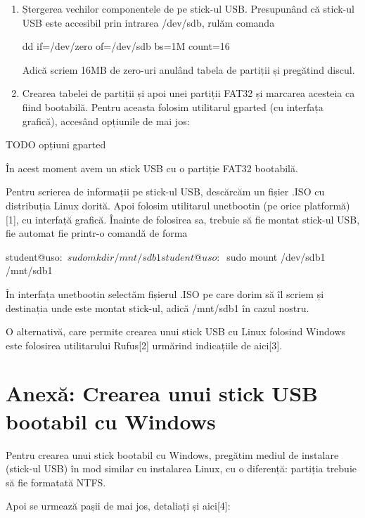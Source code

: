 \begin{enumerate}
	\item Ștergerea vechilor componentele de pe stick-ul USB. Presupunând că
		stick-ul USB este accesibil prin intrarea /dev/sdb, rulăm
		comanda

\begin{screen}
dd if=/dev/zero of=/dev/sdb bs=1M count=16
\end{screen}

Adică scriem 16MB de zero-uri anulând tabela de partiții și pregătind discul.

	\item Crearea tabelei de partiții și apoi unei partiții FAT32 și
		marcarea acesteia ca fiind bootabilă. Pentru aceasta folosim
		utilitarul gparted (cu interfața grafică), accesând opțiunile de
		mai jos:

\end{enumerate}

TODO opțiuni gparted

În acest moment avem un stick USB cu o partiție FAT32 bootabilă.

Pentru scrierea de informații pe stick-ul USB, descărcăm un fișier .ISO cu
distribuția Linux dorită. Apoi folosim utilitarul unetbootin (pe orice
platformă)[1], cu interfață grafică. Înainte de folosirea sa, trebuie să fie
montat stick-ul USB, fie automat fie printr-o comandă de forma

\begin{screen}
student@uso:~$ sudo mkdir /mnt/sdb1
student@uso:~$ sudo mount /dev/sdb1 /mnt/sdb1
\end{screen}

În interfața unetbootin selectăm fișierul .ISO pe care dorim să îl scriem și
destinația unde este montat stick-ul, adică /mnt/sdb1 în cazul nostru.

O alternativă, care permite crearea unui stick USB cu Linux folosind Windows
este folosirea utilitarului Rufus[2] urmărind indicațiile de aici[3].

\section{Anexă: Crearea unui stick USB bootabil cu Windows}
\label{sec:boot-usb-win}

Pentru crearea unui stick bootabil cu Windows, pregătim mediul de instalare
(stick-ul USB) în mod similar cu instalarea Linux, cu o diferență: partiția
trebuie să fie formatată NTFS.

Apoi se urmează pașii de mai jos, detaliați și aici[4]:

